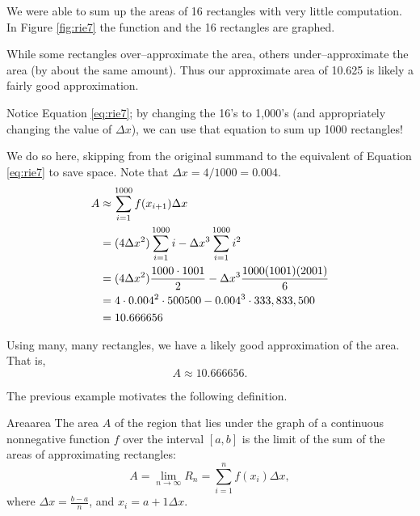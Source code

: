 \begin{solution}
{We were able to sum up the areas of 16 rectangles with very little computation. In Figure \ref{fig:rie7} the function and the 16 rectangles are graphed. 


While some rectangles over--approximate the area, others under--approximate the area (by about the same amount). Thus our approximate area of 10.625 is likely a fairly good approximation. 

Notice  Equation \eqref{eq:rie7}; by changing the 16's to 1,000's (and appropriately changing the value of $\Delta x$), we can use that equation to sum up 1000 rectangles!


We do so here, skipping from the original summand to the equivalent of Equation \eqref{eq:rie7} to save space. Note that $\Delta x = 4/1000 = 0.004$.
\begin{align}
A &\approx \sum_{i=1}^{1000} f(x_{i+1})\Delta x \notag\\
									&= (4\Delta x^2)\sum_{i=1}^{1000} i - \Delta x^3 \sum_{i=1}^{1000} i^2 \notag\\
									&= (4\Delta x^2)\frac{1000\cdot 1001}{2} - \Delta x^3 \frac{1000(1001)(2001)}6 \notag\\
									&=	4\cdot 0.004^2\cdot 500500-0.004^3\cdot 333,833,500\notag\\
									&=10.666656\notag
\end{align}

Using many, many rectangles, we have a likely good approximation of the area. That is, $$A \approx 10.666656.$$
}
\end{solution}


The previous example motivates the following definition.

\begin{definition}{Area}{area}
The area $ A $ of the region that lies under the graph of a continuous nonnegative function $ f $ over the interval $ [a,b] $ is the limit of the sum of the areas of approximating rectangles:
\[
A = \lim_{n\to \infty} R_n = \sum_{i=1}^{n} f(x_i) \Delta x, 
\]
where $ \Delta x = \frac{b-a}{n} $, and $ x_i=a+1\Delta x $.
\end{definition}

